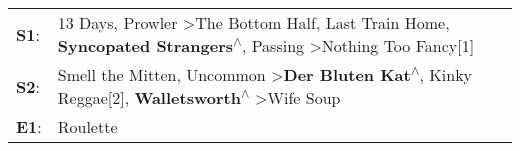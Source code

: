 \begin{supertabular}{p{0.03\textwidth}p{0.92\textwidth}}
 \textbf{S1}:  &  13 Days\textsuperscript{}, \enspace Prowler\textsuperscript{} \textgreater \enspace The Bottom Half\textsuperscript{}, \enspace Last Train Home\textsuperscript{}, \enspace \textbf{Syncopated Strangers\textsuperscript{$\wedge$}}, \enspace Passing\textsuperscript{} \textgreater \enspace Nothing Too Fancy[1]\textsuperscript{}  \enspace  \\
 \textbf{S2}:  &                               Smell the Mitten\textsuperscript{}, \enspace Uncommon\textsuperscript{} \textgreater \enspace \textbf{Der Bluten Kat\textsuperscript{$\wedge$}}, \enspace Kinky Reggae[2]\textsuperscript{}, \enspace \textbf{Walletsworth\textsuperscript{$\wedge$}} \textgreater \enspace Wife Soup\textsuperscript{}  \enspace  \\
 \textbf{E1}:  &                                                                                                                                                                                                                                                                                                            Roulette\textsuperscript{}  \enspace  \\
\end{supertabular}
